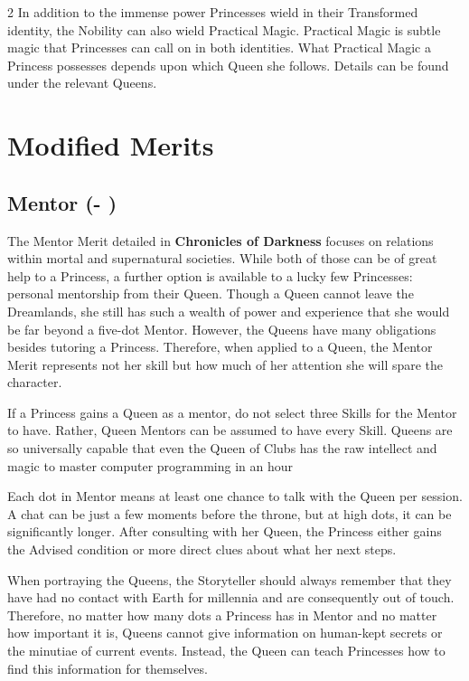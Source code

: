 \begin{multicols}{2}
In addition to the immense power Princesses wield in their Transformed identity, the Nobility can also wield Practical Magic. Practical Magic is subtle magic that Princesses can call on in both identities. What Practical Magic a Princess possesses depends upon which Queen she follows. Details can be found under the relevant Queens. 

\section*{Modified Merits}
\label{sec:Merits}

\subsection*{Mentor (\textbullet - \textbullet\textbullet\textbullet\textbullet\textbullet)}

The Mentor Merit detailed in \textbf{Chronicles of Darkness} focuses on relations within mortal and supernatural societies. While both of those can be of great help to a Princess, a further option is available to a lucky few Princesses: personal mentorship from their Queen. Though a Queen cannot leave the Dreamlands, she still has such a wealth of power and experience that she would be far beyond a five-dot Mentor. However, the Queens have many obligations besides tutoring a Princess. Therefore, when applied to a Queen, the Mentor Merit represents not her skill but how much of her attention she will spare the character.

If a Princess gains a Queen as a mentor, do not select three Skills for the Mentor to have. Rather, Queen Mentors can be assumed to have every Skill. Queens are so universally capable that even the Queen of Clubs has the raw intellect and magic to master computer programming in an hour

Each dot in Mentor means at least one chance to talk with the Queen per session. A chat can be just a few moments before the throne, but at high dots, it can be significantly longer. After consulting with her Queen, the Princess either gains the Advised condition or more direct clues about what her next steps.

When portraying the Queens, the Storyteller should always remember that they have had no contact with Earth for millennia and are consequently out of touch. Therefore, no matter how many dots a Princess has in Mentor and no matter how important it is, Queens cannot give information on human-kept secrets or the minutiae of current events. Instead, the Queen can teach Princesses how to find this information for themselves.


\end{multicols}
